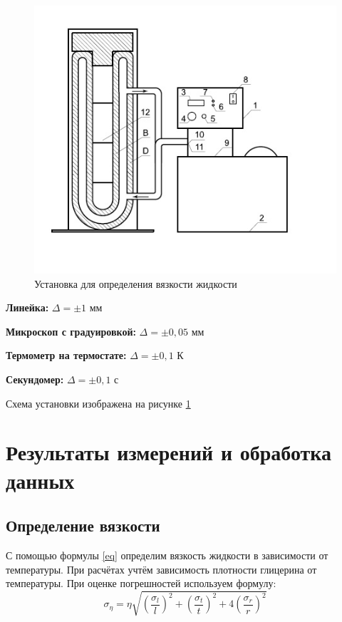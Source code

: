 \documentclass[a4paper]{article}
\begin{document}
\begin{figure}[h]
\includegraphics[scale=0.75]{5}
\caption{Установка для определения вязкости жидкости}
\label{pic}
\end{figure}

{\bf Линейка: } $\Delta = \pm 1 $ мм

{\bf Микроскоп с градуировкой: } $\Delta = \pm 0,05 $ мм

{\bf Термометр на термостате: } $\Delta = \pm 0,1 $ К

{\bf Секундомер: } $\Delta = \pm 0,1 $ с

Схема установки изображена на рисунке \ref{pic}


\section{Результаты измерений и обработка данных}
\subsection{Определение вязкости}
С помощью формулы \ref{eq} определим вязкость жидкости в зависимости от температуры. При расчётах учтём зависимость плотности глицерина от 
температуры. При оценке погрешностей используем формулу:
\begin{equation}
\sigma_\eta = \eta \sqrt{(\frac{\sigma_l}{l})^{2} + (\frac{\sigma_t}{t})^{2} +  4 (\frac{\sigma_r}{r})^{2}}
\end{equation}
\end{document}
